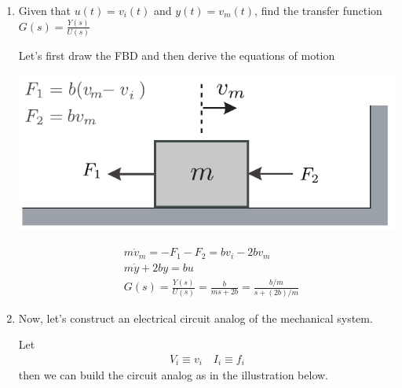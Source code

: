 \documentclass[twoside]{article}
\theoremstyle{definition}
\begin{document}
\begin{enumerate}

\item Given that $u(t) = v_i(t)$ and $y(t) = v_m(t)$, find the transfer
function $G(s) = \frac{Y(s)}{U(s)}$

\vspace{6pt}

Let's first draw the FBD and then derive the equations
of motion

  \begin{minipage}[h]{0.5\linewidth}
    \begin{center}
      \includegraphics[width=1\textwidth]{example_sol}
    \end{center}
  \end{minipage}
  \begin{minipage}[h]{0.5\linewidth}
    \begin{center}
 	\begin{align*}
	&m \dot{v}_m = -F_1 - F_2 = b v_i - 2 b v_m 
	\\
        &m \dot{y}  + 2 b y = b u
         \\
         &G(s) =  \frac{Y(s)}{U(s)} = \frac{b}{m s + 2 b} =
           \frac{b/m}{s + (2 b)/m} 
		\end{align*}
    \end{center}
   \end{minipage}

\item Now, let's construct an electrical circuit analog of the mechanical system.

Let 
%
\begin{align*}
	V_i \equiv v_i
	\quad 
	I_i \equiv f_i
\end{align*}
%
then we can build the circuit analog as in the illustration below. 


\end{enumerate}
\end{document}
